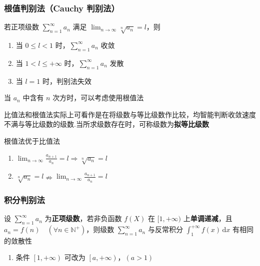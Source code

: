 \documentclass[lang = zh , final , oneside , openany , titlepage , zihao = -4 , linespread = 1.3 , baselineskip = false , cjk-font = windows , text-font = newtx , math-font = newtx , math-style = ISO , uppercase-greek = upright , integral-limits = false]{sjtureport}
\begin{document}
\subsubsection{根值判别法（Cauchy 判别法）}

\begin{theorem}
若正项级数 \(\displaystyle \sum_{n=1}^\infty a_n\) 满足
\(\displaystyle \lim_{n\to\infty} \sqrt[n]{a_n} = l\)，则

\begin{enumerate}
\def\labelenumi{\arabic{enumi}.}
\item
  当 \(0\leq l<1\) 时，\(\displaystyle \sum_{n=1}^\infty a_n\) 收敛
\item
  当 \(1 < l \leq +\infty\) 时，\(\displaystyle \sum_{n=1}^\infty a_n\)
  发散
\item
  当 \(l=1\) 时，判别法失效
\end{enumerate}
\end{theorem}

\begin{remark}
    当 \(a_n\) 中含有 \(n\) 次方时，可以考虑使用根值法
\end{remark}

\begin{remark}
    比值法和根值法实际上可看作是在将级数与等比级数作比较，均智能判断收敛速度不满与等比级数的级数.当所求级数存在时，可称级数为\textbf{拟等比级数}
\end{remark}

\begin{remark}
    根值法优于比值法
    \begin{enumerate}
\item
  \(\displaystyle\lim_{n\to\infty}\frac{a_{n+1}}{a_n} =  l \Rightarrow \displaystyle \sqrt[n]{a_n} = l\)
\item
  \(\displaystyle \sqrt[n]{a_n} =l \nRightarrow \displaystyle\lim_{n\to\infty}\frac{a_{n+1}}{a_n} =  l\)
\end{enumerate}
\end{remark}

\subsubsection{积分判别法}

\begin{definition}
    设 \(\displaystyle \sum_{n=1}^\infty a_n\)
为\textbf{正项级数}，若非负函数 \(f(X)\) 在 \([1,+\infty)\)
上\textbf{单调递减}，且
\(a_n = f(n)\quad \left(\forall n \in \mathbb{N}^+\right)\)，则级数
\(\displaystyle \sum_{n=1}^\infty a_n\) 与反常积分
\(\displaystyle \int_1^{+\infty} f(x)\,\mathrm{d}x\) 有相同的敛散性

\begin{enumerate}
\item
  条件 \(\left[1,+\infty\right)\) 可改为
  \(\left[a,+\infty\right)，(a>1)\)
\end{enumerate}
\end{definition}
\end{document}
